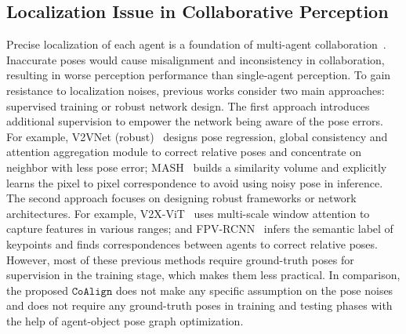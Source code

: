 \documentclass[letterpaper, 10 pt, conference]{ieeeconf}  %
\begin{document}


\subsection{Localization Issue in Collaborative Perception}
Precise localization of each agent is a foundation of multi-agent collaboration{~\cite{pmlr-v155-vadivelu21a, glaser2021overcoming, xu2022v2xvit, 9682601,yuan2022leveraging}}. Inaccurate poses would cause misalignment and inconsistency in collaboration, resulting in worse perception performance than single-agent perception. To gain resistance to localization noises, previous works consider two main approaches: supervised training or robust network design. The first approach introduces additional supervision to empower the network being aware of the pose errors. For example, V2VNet (robust)~\cite{pmlr-v155-vadivelu21a} designs pose regression, global consistency and attention aggregation module to correct relative poses and concentrate on neighbor with less pose error; MASH~\cite{glaser2021overcoming} builds a similarity volume and explicitly learns the pixel to pixel correspondence to avoid using noisy pose in inference. The second approach focuses on designing robust frameworks or network architectures. For example, V2X-ViT~\cite{xu2022v2xvit} uses multi-scale window attention to capture features in various ranges; and FPV-RCNN~\cite{9682601} infers the semantic label of keypoints and finds correspondences between agents to correct relative poses. However, most of these previous methods require ground-truth poses for supervision in the training stage, which makes them less practical. In comparison, the proposed $\mathtt{CoAlign}$ does not make any specific assumption on the pose noises and does not require any ground-truth poses in training and testing phases with the help of agent-object pose graph optimization.
 
\end{document}
